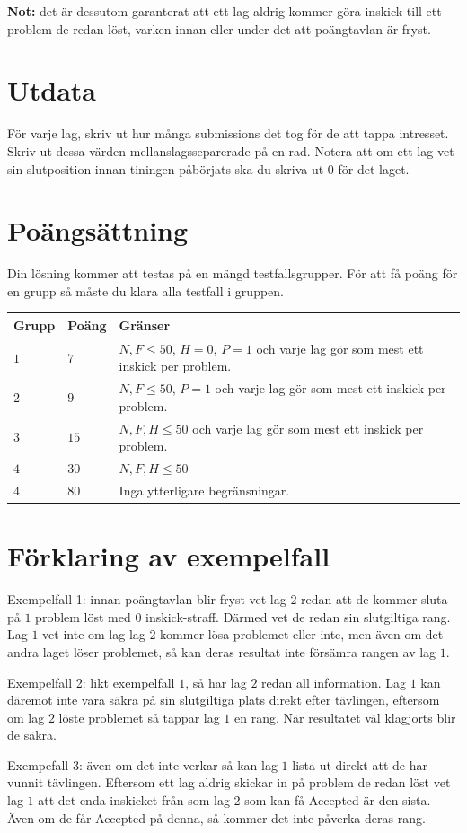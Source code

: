 \textbf{Not:} det är dessutom garanterat att ett lag aldrig kommer göra inskick till ett problem de redan löst,
varken innan eller under det att poängtavlan är fryst.

\section*{Utdata}
För varje lag, skriv ut hur många submissions det tog för de att tappa intresset.
Skriv ut dessa värden mellanslagsseparerade på en rad.
Notera att om ett lag vet sin slutposition innan tiningen påbörjats ska du skriva ut $0$ för det laget.

\section*{Poängsättning}
Din lösning kommer att testas på en mängd testfallsgrupper.
För att få poäng för en grupp så måste du klara alla testfall i gruppen.

\noindent
\begin{tabular}{| l | l | p{12cm} |}
  \hline
  \textbf{Grupp} & \textbf{Poäng} & \textbf{Gränser} \\ \hline
  $1$    & $7$        & $N,F \leq 50$, $H=0$, $P=1$ och varje lag gör som mest ett inskick per problem. \\ \hline
  $2$    & $9$        & $N,F \leq 50$, $P=1$ och varje lag gör som mest ett inskick per problem. \\ \hline
  $3$    & $15$       & $N,F,H \leq 50$ och varje lag gör som mest ett inskick per problem. \\ \hline
  $4$    & $30$       & $N,F,H \leq 50$ \\ \hline
  $4$    & $80$       & Inga ytterligare begränsningar. \\ \hline
\end{tabular}

\section*{Förklaring av exempelfall}
Exempelfall 1: innan poängtavlan blir fryst vet lag $2$ redan att de kommer sluta på $1$ problem löst med $0$ inskick-straff.
Därmed vet de redan sin slutgiltiga rang.
Lag $1$ vet inte om lag lag $2$ kommer lösa problemet eller inte, men även om det andra laget löser problemet,
så kan deras resultat inte försämra rangen av lag $1$.

Exempelfall 2: likt exempelfall $1$, så har lag $2$ redan all information.
Lag $1$ kan däremot inte vara säkra på sin slutgiltiga plats direkt efter tävlingen, eftersom om lag $2$ löste problemet så tappar lag $1$ en rang.
När resultatet väl klagjorts blir de säkra.

Exempefall 3: även om det inte verkar så kan lag $1$ lista ut direkt att de har vunnit tävlingen.
Eftersom ett lag aldrig skickar in på problem de redan löst vet lag $1$ att det enda inskicket från som lag 2 som kan få Accepted är den sista.
Även om de får Accepted på denna, så kommer det inte påverka deras rang.
